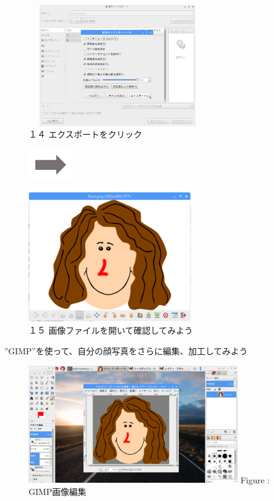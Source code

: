 \documentclass[a4paper,12pt]{jarticle}
\begin{document}
\begin{figure}
  \begin{minipage}{\textwidth}
    \begin{minipage}{8.074cm}
      \includegraphics[width=7.721cm,height=5.26cm]{textbook-img134.png}\\
      １４ エクスポートをクリック
    \end{minipage}
    \includegraphics[width=1.919cm,height=1.365cm]{textbook-img135.png}
    \begin{minipage}{7.328cm}
      \includegraphics[width=7.061cm,height=5.653cm]{textbook-img139.png}\\
      １５
      画像ファイルを開いて確認してみよう
    \end{minipage}
  \end{minipage}



\end{figure}

”GIMP”を使って、自分の顔写真をさらに編集、加工してみよう

\begin{figure}[ht]
  \centering
  \begin{minipage}{9.082cm}
    {\upshape
      \includegraphics[width=9.082cm,height=5.105cm]{textbook-img131.png}
      \newline
      Figure : GIMP画像編集}
  \end{minipage}
\end{figure}

~
\vfill
\clearpage
\end{document}
